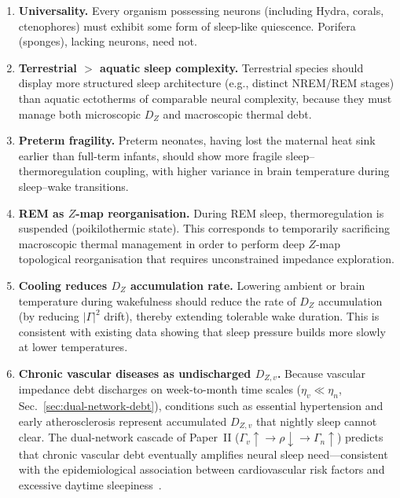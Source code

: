 ﻿\documentclass[aps,pre,twocolumn,superscriptaddress,floatfix]{revtex4-2}
\begin{document}
\begin{enumerate}
  \item \textbf{Universality.}
    Every organism possessing neurons
    (including Hydra, corals, ctenophores)
    must exhibit some form of sleep-like quiescence.
    Porifera (sponges), lacking neurons, need not.

  \item \textbf{Terrestrial $>$ aquatic sleep complexity.}
    Terrestrial species should display more structured
    sleep architecture (e.g., distinct NREM/REM stages)
    than aquatic ectotherms of comparable neural complexity,
    because they must manage both microscopic $D_Z$
    and macroscopic thermal debt.

  \item \textbf{Preterm fragility.}
    Preterm neonates, having lost the maternal heat sink
    earlier than full-term infants, should show
    more fragile sleep--thermoregulation coupling,
    with higher variance in brain temperature
    during sleep--wake transitions.

  \item \textbf{REM as $Z$-map reorganisation.}
    During REM sleep, thermoregulation is suspended
    (poikilothermic state).
    This corresponds to temporarily sacrificing
    macroscopic thermal management in order to
    perform deep $Z$-map topological reorganisation
    that requires unconstrained impedance exploration.

  \item \textbf{Cooling reduces $D_Z$ accumulation rate.}
    Lowering ambient or brain temperature during
    wakefulness should reduce the rate of $D_Z$
    accumulation (by reducing $|\Gamma|^2$ drift),
    thereby extending tolerable wake duration.
    This is consistent with existing data showing
    that sleep pressure builds more slowly at lower
    temperatures.

  \item \textbf{Chronic vascular diseases as undischarged $D_{Z,v}$.}
    Because vascular impedance debt discharges on
    week-to-month time scales ($\eta_v \ll \eta_n$,
    Sec.~\ref{sec:dual-network-debt}),
    conditions such as essential hypertension and early
    atherosclerosis represent accumulated $D_{Z,v}$ that
    nightly sleep cannot clear.
    The dual-network cascade of Paper~II
    ($\Gamma_v\!\uparrow \to \rho\!\downarrow \to
    \Gamma_n\!\uparrow$) predicts that chronic
    vascular debt eventually amplifies neural sleep
    need---consistent with the epidemiological
    association between cardiovascular risk factors
    and excessive daytime sleepiness~\cite{PaperII}.
\end{enumerate}
\end{document}
